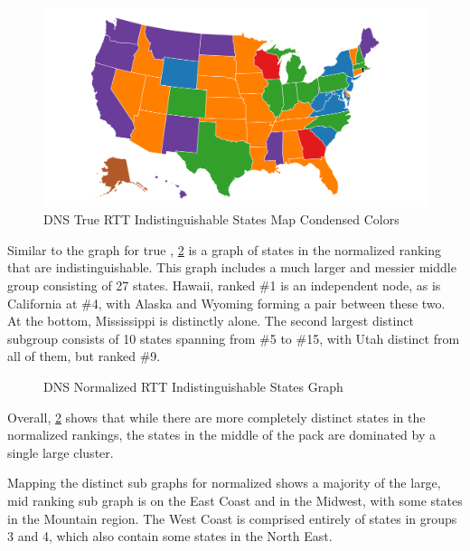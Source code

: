\begin{figure}[H]
    \centering
    \includegraphics[width=\textwidth]{images/dns/analysis_no_auth_agg/rtt/no_auth_distinct_rtt_map_condensed.png}
    \caption{DNS True RTT Indistinguishable States Map Condensed Colors}
    \label{fig:dns_true_rtt_indistinguishable_states_map_condensed_colors}
\end{figure}

Similar to the graph for true \rtt, \cref{fig:dns_normalized_rtt_indistinguishable_states_graph} is a graph of states in the normalized \rtt ranking that are indistinguishable. This graph includes a much larger and messier middle group consisting of 27 states. Hawaii, ranked \#1 is an independent node, as is California at \#4, with Alaska and Wyoming forming a pair between these two. At the bottom, Mississippi is distinctly alone. The second largest distinct subgroup consists of 10 states spanning from \#5 to \#15, with Utah distinct from all of them, but ranked \#9.

\begin{figure}[H]
    \centering
    
    \caption{DNS Normalized RTT Indistinguishable States Graph}
    \label{fig:dns_normalized_rtt_indistinguishable_states_graph}
\end{figure}

Overall, \cref{fig:dns_normalized_rtt_indistinguishable_states_graph} shows that while there are more completely distinct states in the normalized rankings, the states in the middle of the pack are dominated by a single large cluster.

Mapping the distinct sub graphs for normalized \dns \rtt shows a majority of the large, mid ranking sub graph is on the East Coast and in the Midwest, with some states in the Mountain region. The West Coast is comprised entirely of states in groups 3 and 4, which also contain some states in the North East.

